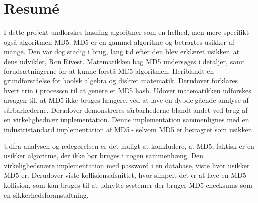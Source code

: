 \documentclass[12pt]{article}
\begin{document}
\thispagestyle{empty}
\newpage

\section*{Resumé}
 I dette projekt undforskes hashing algoritmer som en helhed, men mere specifikt også algoritmen MD5. MD5 er en gammel algoritme og betragtes usikker af mange. Den var dog stadig i brug, lang tid efter den blev erklæret usikker, at dens udvikler, Ron Rivest. 
Matematikken bag MD5 undersøges i detaljer, samt forudsætningerne for at kunne forstå MD5 algoritmen. Heriblandt en grundforståelse for boolsk algebra og diskret matematik. Derudover forklares hvert trin i processen til at genere et MD5 hash. Udover matematikken udforskes årsagen til, at MD5 ikke bruges længere, ved at lave en dybde gående analyse af sårbarhederne. Derudover demonstreres sårbarhederne blandt andet ved brug af en virkelighednær implementation. Denne implementation sammenlignes med en industristandard implementation af MD5 - selvom MD5 er betragtet som usikker. 


Udfra analysen og redegørelsen er det muligt at konkludere, at MD5, faktisk er en usikker algoritme, der ikke bør bruges i nogen sammenhæng. Den virkelighedsnære implementation med password i en database, viste hvor usikker MD5 er. Derudover viste kollisionsafsnittet, hvor simpelt det er at lave en MD5 kollision, som kan bruges til at udnytte systemer der bruger MD5 checksums som en sikkerhedsforanstaltning.   
\end{document}
